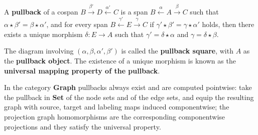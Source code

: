 \begin{definition} 
    \label{def:cat:pb}
   A \textbf{pullback} of a cospan \(B \overset{\beta'}{\rightarrow} D \overset{\alpha'}{\leftarrow} C \)
is a span \( B \overset{\alpha}{\leftarrow} A \overset{\beta}{\rightarrow} C \) such that \( \alpha \mathop{\star} \beta' \mathop{=} \beta \mathop{\star} \alpha' \), and for every span \( B \overset{\gamma'}{\leftarrow} E \overset{\gamma}{\rightarrow} C \) if \(\gamma' \mathop{\star} \beta' \mathop{=} \gamma \mathop{\star} \alpha'\) holds, then there exists a unique morphism \(\delta: E  \mathop{\to} A\) such that $\gamma' \mathop{=} \delta \mathop{\star} \alpha$ and $\gamma \mathop{=} \delta \mathop{\star} \beta$. 
    \begin{center}
                \end{center}
The diagram involving \( (\alpha, \beta, \alpha', \beta') \) is called the \textbf{pullback square}, with \(A\) as the \textbf{pullback object}. The existence of a unique morphism is known as the \textbf{universal mapping property of the pullback}.
\end{definition} 
In the category \textbf{Graph} pullbacks always exist and are computed pointwise: take the pullback in \textbf{Set} of the node sets and of the edge sets, and equip the resulting graph with source, target and labeling maps induced componentwise; the projection graph homomorphisms are the corresponding componentwise projections and they satisfy the universal property.
